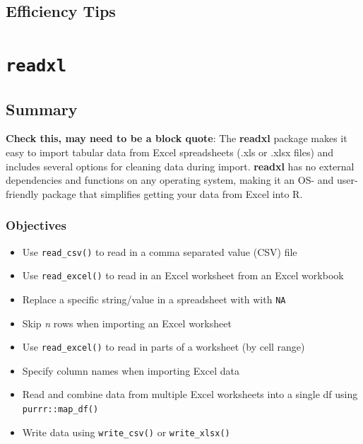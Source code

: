 \documentclass[]{book}
\providecommand{\tightlist}{%
  \setlength{\itemsep}{0pt}\setlength{\parskip}{0pt}}
\begin{document}
\hypertarget{efficiency-tips-1}{%
\section{Efficiency Tips}\label{efficiency-tips-1}}

\hypertarget{readxl}{%
\chapter{\texorpdfstring{\texttt{readxl}}{readxl}}\label{readxl}}

\hypertarget{summary-2}{%
\section{Summary}\label{summary-2}}

\textbf{Check this, may need to be a block quote}: The \textbf{readxl} package makes it easy to import tabular data from Excel spreadsheets (.xls or .xlsx files) and includes several options for cleaning data during import. \textbf{readxl} has no external dependencies and functions on any operating system, making it an OS- and user-friendly package that simplifies getting your data from Excel into R.

\hypertarget{objectives-2}{%
\subsection{Objectives}\label{objectives-2}}

\begin{itemize}
\tightlist
\item
  Use \texttt{read\_csv()} to read in a comma separated value (CSV) file
\item
  Use \texttt{read\_excel()} to read in an Excel worksheet from an Excel workbook
\item
  Replace a specific string/value in a spreadsheet with with \texttt{NA}
\item
  Skip \emph{n} rows when importing an Excel worksheet
\item
  Use \texttt{read\_excel()} to read in parts of a worksheet (by cell range)
\item
  Specify column names when importing Excel data
\item
  Read and combine data from multiple Excel worksheets into a single df using \texttt{purrr::map\_df()}
\item
  Write data using \texttt{write\_csv()} or \texttt{write\_xlsx()}
\end{itemize}
\end{document}
